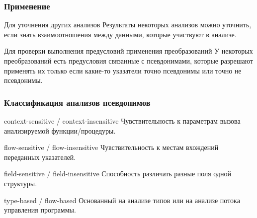 \documentclass[utf8,russian]{beamer}
\begin{document}
\begin{frame}
\frametitle{Применение}

\begin{block}{Для уточнения других анализов}
Результаты некоторых анализов можно уточнить, если знать взаимоотношения между данными, которые участвуют в анализе.
\end{block}

\begin{block}{Для проверки выполнения предусловий применения преобразований}
У некоторых преобразований есть предусловия связанные с псевдонимами, которые разрешают применять их только если какие-то указатели точно псевдонимы или точно не псевдонимы.
\end{block}

\end{frame}


\begin{frame}
\frametitle{Классификация анализов псевдонимов}

\begin{block}{context-sensitive / context-insensitive}
Чувствительность к параметрам вызова анализируемой функции/процедуры.
\end{block}

\begin{block}{flow-sensitive / flow-insensitive}
Чувствительность к местам вхождений переданных указателей.
\end{block}

\begin{block}{field-sensitive / field-insensitive}
Способность различать разные поля одной структуры.
\end{block}

\begin{block}{type-based / flow-based}
Основанный на анализе типов или на анализе потока управления программы.
\end{block}

\end{frame}

\end{document}
